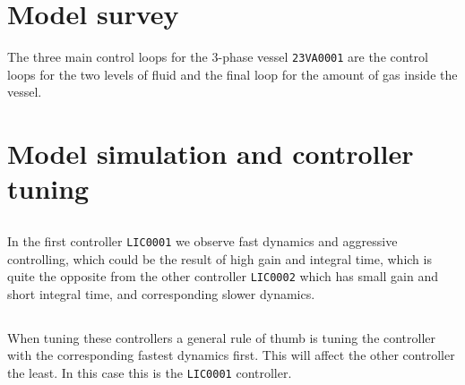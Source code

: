 \documentclass[a4paper]{scrartcl}
\begin{document}
\section{Model survey}
The three main control loops for the 3-phase vessel \texttt{23VA0001} are the control loops for the two levels of fluid and the final loop for the amount of gas inside the vessel.\\

\section{Model simulation and controller tuning}
\subsection{}
In the first controller \texttt{LIC0001} we observe fast dynamics and aggressive controlling, which could be the result of high gain and integral time, which is quite the opposite from the other controller \texttt{LIC0002} which has small gain and short integral time, and corresponding slower dynamics.

\subsection{}
When tuning these controllers a general rule of thumb is tuning the controller with the corresponding fastest dynamics first. This will affect the other controller the least. In this case this is the \texttt{LIC0001} controller.
\end{document}
